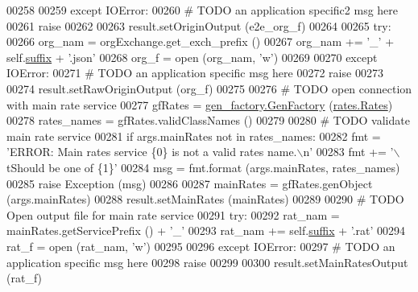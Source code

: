 \begin{DoxyCode}
{00258             
00259         \textcolor{keywordflow}{except} IOError:
00260             \textcolor{comment}{# TODO an application specific2 msg here}
00261             \textcolor{keywordflow}{raise}
00262 
00263         result.setOriginOutput (e2e\_org\_f)
00264             
00265         \textcolor{keywordflow}{try}:
00266             org\_nam  = orgExchange.get\_exch\_prefix ()
00267             org\_nam += \textcolor{stringliteral}{'\_'} + self.\hyperlink{classe2e_1_1_application_a4d824ad36b051d2d629edb314385df0d}{suffix} + \textcolor{stringliteral}{'.json'}
00268             org\_f = open (org\_nam, \textcolor{stringliteral}{'w'})
00269             
00270         \textcolor{keywordflow}{except} IOError:
00271             \textcolor{comment}{# TODO an application specific msg here}
00272             \textcolor{keywordflow}{raise}
00273             
00274         result.setRawOriginOutput (org\_f)
00275             
00276         \textcolor{comment}{# TODO open connection with main rate service}
00277         gfRates = \hyperlink{classgen__factory_1_1_gen_factory}{gen\_factory.GenFactory} (\hyperlink{classrates_1_1_rates}{rates.Rates})
00278         rates\_names = gfRates.validClassNames ()
00279 
00280         \textcolor{comment}{# TODO validate main rate service}
00281         \textcolor{keywordflow}{if} args.mainRates \textcolor{keywordflow}{not} \textcolor{keywordflow}{in} rates\_names:
00282             fmt  = \textcolor{stringliteral}{'ERROR: Main rates service \{0\} is not a valid rates name.\(\backslash\)n'}
00283             fmt += \textcolor{stringliteral}{'\(\backslash\)tShould be one of \{1\}'}
00284             msg = fmt.format (args.mainRates, rates\_names)
00285             \textcolor{keywordflow}{raise} Exception (msg)
00286 
00287         mainRates = gfRates.genObject (args.mainRates)
00288         result.setMainRates (mainRates)
00289         
00290         \textcolor{comment}{# TODO Open output file for main rate service}
00291         \textcolor{keywordflow}{try}:
00292             rat\_nam  =  mainRates.getServicePrefix () + \textcolor{stringliteral}{'\_'}
00293             rat\_nam +=  self.\hyperlink{classe2e_1_1_application_a4d824ad36b051d2d629edb314385df0d}{suffix} + \textcolor{stringliteral}{'.rat'}
00294             rat\_f = open (rat\_nam, \textcolor{stringliteral}{'w'})
00295             
00296         \textcolor{keywordflow}{except} IOError:
00297             \textcolor{comment}{# TODO an application specific msg here}
00298             \textcolor{keywordflow}{raise}        
00299 
00300         result.setMainRatesOutput (rat\_f)
}
\end{DoxyCode}
